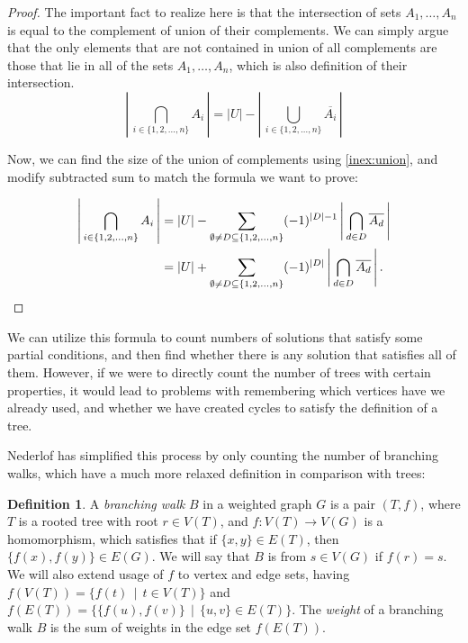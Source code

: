 \documentclass[thesis=M,english,hidelinks]{FITthesis}[2012/10/20]
\theoremstyle{definition}
\newtheorem{definition}{Definition}
\begin{document}
\begin{proof}
    The important fact to realize here is that the intersection of sets $A_1, \ldots, A_n$ is equal to the complement of
    union of their complements.  We can simply argue that the only elements that are not contained in union of all
    complements are those that lie in all of the sets $A_1, \ldots, A_n$, which is also definition of their
    intersection.
    $$
    \left\lvert\,\bigcap_{i \in \{1, 2, \ldots, n\}} A_i\,\right\rvert =
    |U| - \left\lvert\,\bigcup_{i \in \{1, 2, \ldots, n\}} \overline{A_i}\,\right\rvert
    $$

    Now, we can find the size of the union of complements using \autoref{inex:union}, and modify subtracted sum to match
    the formula we want to prove:

    \begin{equation*}
        \begin{split}
            \left\lvert\,\bigcap_{i \in \{1, 2, \ldots, n\}} A_i\,\right\rvert
            &=
            |U| - \sum_{\emptyset \neq D \subseteq \{1, 2, \ldots, n \}} (-1)^{|D|-1} \left\lvert\,\bigcap_{d \in D}
            \overline{A_d}\,\right\rvert \\
            &=
            |U| + \sum_{\emptyset \neq D \subseteq \{1, 2, \ldots, n \}} (-1)^{|D|} \left\lvert\,\bigcap_{d \in D}
            \overline{A_d}\,\right\rvert.
            \qedhere
        \end{split}
    \end{equation*}
\end{proof}

We can utilize this formula to count numbers of solutions that satisfy some partial conditions, and then find whether
there is any solution that satisfies all of them. However, if we were to directly count the number of trees with certain
properties, it would lead to problems with remembering which vertices have we already used, and whether we have created
cycles to satisfy the definition of a tree.

Nederlof has simplified this process by only counting the number of branching walks, which have a much more relaxed
definition in comparison with trees:

\begin{definition}
    A \emph{branching walk} $B$ in a weighted graph $G$ is a pair $(T, f)$, where $T$ is a rooted tree with root $r \in
    V(T)$, and $f: V(T) \rightarrow V(G) $ is a homomorphism, which satisfies that if $\{x, y\} \in E(T)$, then
    $\{f(x), f(y)\} \in E(G)$. We will say that $B$ is from $s \in V(G)$ if $f(r) = s$.  We will also extend usage of
    $f$ to vertex and edge sets, having $f(V(T)) = \{f(t)\,\mid\,t \in V(T)\}$ and $f(E(T)) = \{\{f(u),
    f(v)\}\,\mid\,\{u, v\} \in E(T)\}$. The \emph{weight} of a branching walk $B$ is the sum of weights in the edge set
    $f(E(T))$.
\end{definition}
\end{document}
